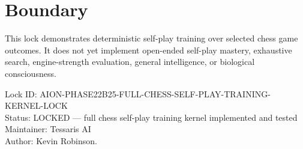 \documentclass[11pt,a4paper]{article}
\begin{document}
\section{Boundary}

This lock demonstrates deterministic self-play training over selected chess game outcomes. It does not yet implement open-ended self-play mastery, exhaustive search, engine-strength evaluation, general intelligence, or biological consciousness.

\bigskip

\noindent
Lock ID: AION-PHASE22B25-FULL-CHESS-SELF-PLAY-TRAINING-KERNEL-LOCK\\
Status: LOCKED --- full chess self-play training kernel implemented and tested\\
Maintainer: Tessaris AI\\
Author: Kevin Robinson.
\end{document}
